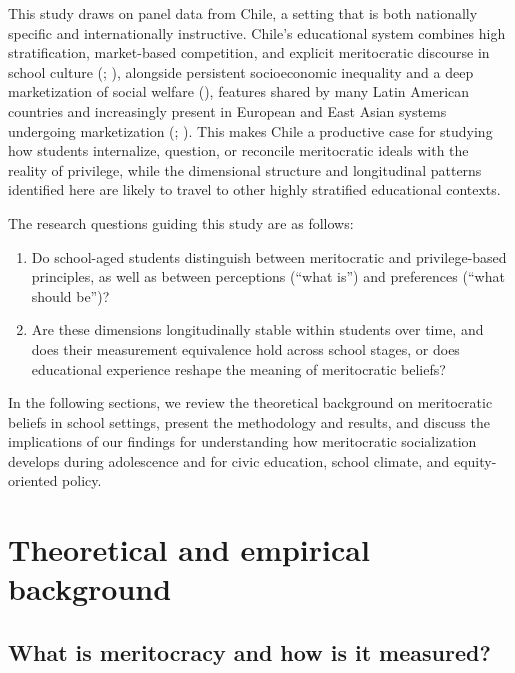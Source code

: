 \documentclass[
  13pt,
]{article}
\begin{document}
This study draws on panel data from Chile, a setting that is both
nationally specific and internationally instructive. Chile's educational
system combines high stratification, market-based competition, and
explicit meritocratic discourse in school culture
(;
),
alongside persistent socioeconomic inequality and a deep marketization
of social welfare (),
features shared by many Latin American countries and increasingly
present in European and East Asian systems undergoing marketization
(;
). This makes Chile a
productive case for studying how students internalize, question, or
reconcile meritocratic ideals with the reality of privilege, while the
dimensional structure and longitudinal patterns identified here are
likely to travel to other highly stratified educational contexts.

The research questions guiding this study are as follows:

\begin{enumerate}
\def\labelenumi{(\arabic{enumi})}
\item
  Do school-aged students distinguish between meritocratic and
  privilege-based principles, as well as between perceptions (``what
  is'') and preferences (``what should be'')?
\item
  Are these dimensions longitudinally stable within students over time,
  and does their measurement equivalence hold across school stages, or
  does educational experience reshape the meaning of meritocratic
  beliefs?
\end{enumerate}

In the following sections, we review the theoretical background on
meritocratic beliefs in school settings, present the methodology and
results, and discuss the implications of our findings for understanding
how meritocratic socialization develops during adolescence and for civic
education, school climate, and equity-oriented policy.

\section{Theoretical and empirical
background}\label{theoretical-and-empirical-background}

\subsection{What is meritocracy and how is it
measured?}\label{what-is-meritocracy-and-how-is-it-measured}
\end{document}
